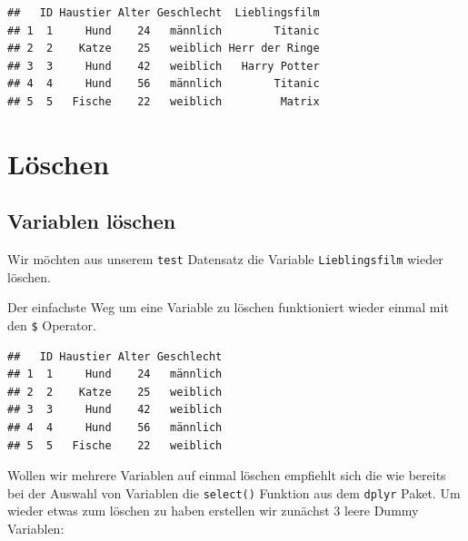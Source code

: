 \documentclass[
]{book}
\newenvironment{Shaded}{\begin{snugshade}}{\end{snugshade}}
\newcommand{\ConstantTok}[1]{\textcolor[rgb]{0.00,0.00,0.00}{#1}}
\newcommand{\NormalTok}[1]{#1}
\newcommand{\OtherTok}[1]{\textcolor[rgb]{0.56,0.35,0.01}{#1}}
\newcommand{\SpecialCharTok}[1]{\textcolor[rgb]{0.00,0.00,0.00}{#1}}
\begin{document}
\begin{verbatim}
##   ID Haustier Alter Geschlecht  Lieblingsfilm
## 1  1     Hund    24   männlich        Titanic
## 2  2    Katze    25   weiblich Herr der Ringe
## 3  3     Hund    42   weiblich   Harry Potter
## 4  4     Hund    56   männlich        Titanic
## 5  5   Fische    22   weiblich         Matrix
\end{verbatim}

\hypertarget{luxf6schen}{%
\section{Löschen}\label{luxf6schen}}

\hypertarget{variablen-luxf6schen}{%
\subsection{Variablen löschen}\label{variablen-luxf6schen}}

Wir möchten aus unserem \texttt{test} Datensatz die Variable \texttt{Lieblingsfilm} wieder löschen.

Der einfachste Weg um eine Variable zu löschen funktioniert wieder einmal mit den \texttt{\$} Operator.

\begin{Shaded}
\end{Shaded}

\begin{verbatim}
##   ID Haustier Alter Geschlecht
## 1  1     Hund    24   männlich
## 2  2    Katze    25   weiblich
## 3  3     Hund    42   weiblich
## 4  4     Hund    56   männlich
## 5  5   Fische    22   weiblich
\end{verbatim}

Wollen wir mehrere Variablen auf einmal löschen empfiehlt sich die wie bereits bei der Auswahl von Variablen die \texttt{select()} Funktion aus dem \texttt{dplyr} Paket. Um wieder etwas zum löschen zu haben erstellen wir zunächst 3 leere Dummy Variablen:

\begin{Shaded}
\end{Shaded}
\end{document}
